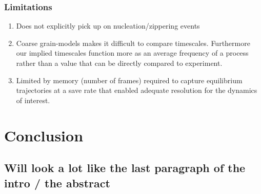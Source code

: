 \documentclass[journal=jpcbfk,manuscript=article]{achemso}
\begin{document}
\subsubsection{\label{sec:Results}Limitations} 

\begin{enumerate}
	\item Does not explicitly pick up on nucleation/zippering events
	\item Coarse grain-models makes it difficult to compare timescales. Furthermore our implied timescales function more as an average frequency of a process rather than a value that can be directly compared to experiment. 
	\item Limited by memory (number of frames) required to capture equilibrium trajectories at a save rate that enabled adequate resolution for the dynamics of interest.
	
\end{enumerate}


\section{\label{sec:conc}Conclusion}
\subsection{\label{sec:Results}Will look a lot like the last paragraph of the intro / the abstract}
\end{document}
